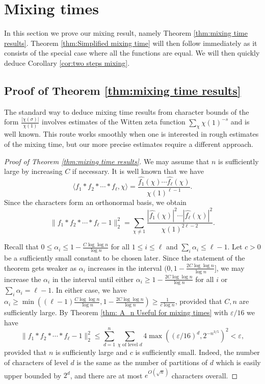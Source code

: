 \documentclass[11pt, letterpaper]{amsart}
\newcommand\eps{\varepsilon}
\renewcommand\ge{\geqslant}
\renewcommand\le{\leqslant}
\renewcommand{\epsilon}{\eps}
\begin{document}
\section{Mixing times}
\label{sec:mixing times}

In this section we prove our mixing result, namely Theorem \ref{thm:mixing time results}. Theorem \ref{thm:Simplified mixing time} will then follow immediately as it consists of the special case where all the functions are equal. We will then quickly deduce Corollary \ref{cor:two steps mixing}.
\subsection{Proof of Theorem \ref{thm:mixing time results}}

The standard way to deduce mixing time results from character bounds of the form $\frac{|\chi(\sigma)|}{\chi(1)}$ involves estimates of the Witten zeta function $\sum_{\chi}\chi(1)^{-s}$ and is well known. This route works smoothly when one is interested in rough estimates of the mixing time, but our more precise estimates require a different approach. 

\begin{proof}[Proof of Theorem \ref{thm:mixing time results}]
We may assume that $n$ is sufficiently large by increasing $C$ if necessary.
It is well known that we have \[\langle f_1*f_2*\cdots * f_\ell,\chi\rangle = \frac{\hat{f_1}(\chi)\cdots \hat{f_\ell}(\chi)}{\chi(1)^{\ell-1}}.\]
Since the characters form an orthonormal basis, we obtain
\[
    \|f_1*f_2*\cdots * f_\ell - 1\|_2^2 = \sum_{\chi \ne 1 }\frac{|\hat{f_1}(\chi)|^2\cdots |\hat{f_\ell}(\chi)|^2}{\chi(1)^{2\ell-2}}.
\]

Recall that $0 \le \alpha_i \le 1-\frac{C\log\log n}{\log n}$ for all $1 \le i \le \ell$ and $\sum_i\alpha_i \le \ell-1$. Let $c>0$ be a sufficiently small constant to be chosen later. Since the statement of the theorem gets weaker as $\alpha_i$ increases in the interval $(0,1-\frac{2C\log\log n}{\log n}]$, we may increase the $\alpha_i$ in the interval until either $\alpha_i \ge 1-\frac{2C\log\log n}{\log n}$ for all $i$ or $\sum_i\alpha_i = \ell-1$. In either case, we have $\alpha_i\ge \min((\ell-1)\frac{C\log \log n}{\log n}, 1-\frac{2C\log\log n}{\log n})\ge \frac{1}{c\log n}$, provided that $C,n$ are sufficiently large. By Theorem \ref{thm: A_n Useful for mixing times} with $\epsilon/16$ we have 
\[\|f_1*f_2*\cdots * f_\ell - 1\|_2^2 \le \sum_{d=1}^{n}\sum_{\chi \text{ of level }d}  4\max((\epsilon/16)^{d}, 2^{-n^{3/5}})^2 <  \epsilon,\] 
provided that $n$ is sufficiently large and $c$ is sufficiently small. Indeed, the number of characters of level $d$ is the same as the number of partitions of $d$ which is easily upper bounded by $2^d$, and there are at most $e^{O(\sqrt{n})}$ characters overall. 
\end{proof}
\end{document}
